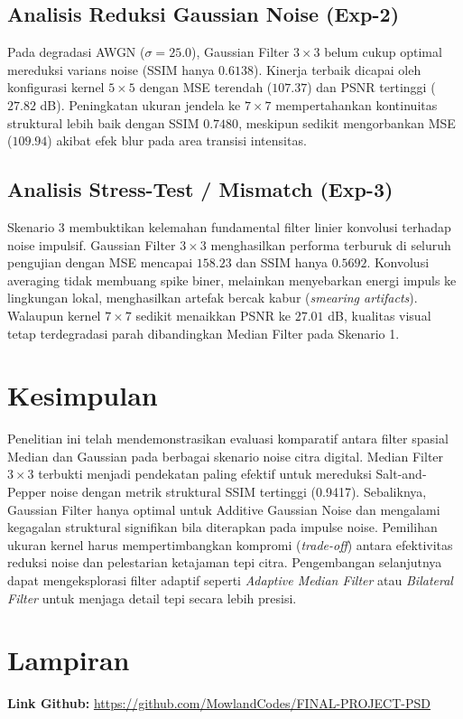 \documentclass[conference,a4paper]{IEEEtran}
\begin{document}
\subsection{Analisis Reduksi Gaussian Noise (Exp-2)}
Pada degradasi AWGN ($\sigma=25.0$), Gaussian Filter $3\times3$ belum cukup optimal mereduksi varians noise (SSIM hanya $0.6138$). Kinerja terbaik dicapai oleh konfigurasi kernel $5\times5$ dengan MSE terendah ($107.37$) dan PSNR tertinggi ($27.82$ dB). Peningkatan ukuran jendela ke $7\times7$ mempertahankan kontinuitas struktural lebih baik dengan SSIM $0.7480$, meskipun sedikit mengorbankan MSE ($109.94$) akibat efek blur pada area transisi intensitas.

\subsection{Analisis Stress-Test / Mismatch (Exp-3)}
Skenario 3 membuktikan kelemahan fundamental filter linier konvolusi terhadap noise impulsif. Gaussian Filter $3\times3$ menghasilkan performa terburuk di seluruh pengujian dengan MSE mencapai $158.23$ dan SSIM hanya $0.5692$. Konvolusi averaging tidak membuang spike biner, melainkan menyebarkan energi impuls ke lingkungan lokal, menghasilkan artefak bercak kabur (\textit{smearing artifacts}). Walaupun kernel $7\times7$ sedikit menaikkan PSNR ke $27.01$ dB, kualitas visual tetap terdegradasi parah dibandingkan Median Filter pada Skenario 1.

\section{Kesimpulan}
Penelitian ini telah mendemonstrasikan evaluasi komparatif antara filter spasial Median dan Gaussian pada berbagai skenario noise citra digital. Median Filter $3\times3$ terbukti menjadi pendekatan paling efektif untuk mereduksi Salt-and-Pepper noise dengan metrik struktural SSIM tertinggi (0.9417). Sebaliknya, Gaussian Filter hanya optimal untuk Additive Gaussian Noise dan mengalami kegagalan struktural signifikan bila diterapkan pada impulse noise. Pemilihan ukuran kernel harus mempertimbangkan kompromi (\textit{trade-off}) antara efektivitas reduksi noise dan pelestarian ketajaman tepi citra. Pengembangan selanjutnya dapat mengeksplorasi filter adaptif seperti \textit{Adaptive Median Filter} atau \textit{Bilateral Filter} untuk menjaga detail tepi secara lebih presisi.

\section*{Lampiran}
\textbf{Link Github:} \href{https://github.com/MowlandCodes/FINAL-PROJECT-PSD}{https://github.com/MowlandCodes/FINAL-PROJECT-PSD}
\end{document}
